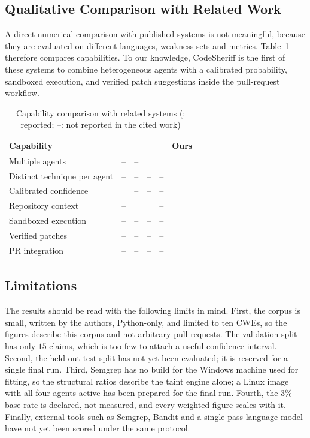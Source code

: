 \documentclass[conference]{IEEEtran}
\newcommand{\cmark}{\ding{51}}
\begin{document}
\subsection{Qualitative Comparison with Related Work}
A direct numerical comparison with published systems is not meaningful,
because they are evaluated on different languages, weakness sets and
metrics. Table~\ref{tab:related} therefore compares capabilities. To our
knowledge, CodeSheriff is the first of these systems to combine
heterogeneous agents with a calibrated probability, sandboxed execution,
and verified patch suggestions inside the pull-request workflow.

\begin{table}[t]
\centering
\caption{Capability comparison with related systems
(\cmark: reported; --: not reported in the cited work)}
\label{tab:related}
\small
\setlength{\tabcolsep}{2.5pt}
\begin{tabular}{lccccc}
\toprule
Capability & \cite{ref2} & \cite{ref1} & \cite{ref16} & \cite{ref6} & Ours \\
\midrule
Multiple agents              & --     & --     & \cmark & \cmark & \cmark \\
Distinct technique per agent & --     & --     & --     & --     & \cmark \\
Calibrated confidence        & \cmark & --     & --     & --     & \cmark \\
Repository context           & --     & \cmark & \cmark & --     & \cmark \\
Sandboxed execution          & --     & --     & --     & --     & \cmark \\
Verified patches             & --     & --     & --     & --     & \cmark \\
PR integration               & --     & --     & --     & --     & \cmark \\
\bottomrule
\end{tabular}
\end{table}

\subsection{Limitations}
The results should be read with the following limits in mind. First, the
corpus is small, written by the authors, Python-only, and limited to ten
CWEs, so the figures describe this corpus and not arbitrary pull requests.
The validation split has only $15$ claims, which is too few to attach a
useful confidence interval. Second, the held-out test split has not yet
been evaluated; it is reserved for a single final run. Third, Semgrep has
no build for the Windows machine used for fitting, so the structural
ratios describe the taint engine alone; a Linux image with all four agents
active has been prepared for the final run. Fourth, the $3\%$ base rate is
declared, not measured, and every weighted figure scales with it. Finally,
external tools such as Semgrep, Bandit and a single-pass language model
have not yet been scored under the same protocol.
\end{document}
